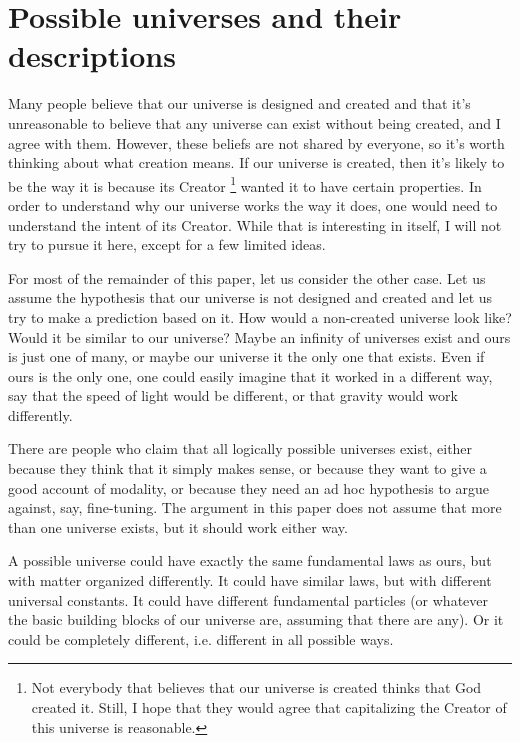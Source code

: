 \documentclass[a4paper
,draft
]{article}
\newcommand{\svn}[2][]{\todo[author=Virgil,color=red!25!white,#1]{#2}}
\newcommand{\paper}[1]{paper}
\newcommand{\ghilimele}[1]{``#1"}
\begin{document}
\section{Possible universes and their descriptions}

Many people believe that our universe is designed and created
and that it's unreasonable to believe that any universe can exist
without being created, and I agree with them.
However, these beliefs are not shared by everyone, so it's worth thinking
about what creation means.
If our universe is created, then it's likely to be the way it is because
its Creator
\footnote{Not everybody that believes that our universe is created
thinks that God created it.
Still, I hope that they would agree that capitalizing the Creator
of this universe is reasonable.}
\svn{Do I need this footnote?}{} wanted it to have certain properties.
In order to understand why our universe works the way it does,
one would need to understand the intent of its Creator.
While that is interesting in itself, I will not try to pursue it here,
except for a few limited ideas.

For most of the remainder of this \paper{}, let us consider the other case.
Let us assume the hypothesis that our universe is not designed and created
and let us try to make a prediction based on it.
How would a non-created universe look like?
Would it be similar to our universe?
Maybe an infinity of universes exist and ours is just one of many,
or maybe our universe it the only one that exists.
Even if ours is the only one, one could easily imagine that it worked
in a different way, say that the speed of light would be different,
or that gravity would work differently.

There are people who claim that all logically possible universes exist,
either because they think that it simply makes sense, or because they want to
give a good account of modality, or because they need
an ad hoc\svn{Do I need the \ghilimele{ad-hoc} part?}{} hypothesis
to argue against, say, fine-tuning.
The argument in this \paper{} does not assume that more than
one universe exists, but it should work either way.

A possible universe
could have exactly the same fundamental laws as ours, but with matter
organized differently.
It could have similar laws, but with different universal constants.
It could have different fundamental particles (or whatever the basic
building blocks of our universe are, assuming that there are any).
Or it could be completely different, i.e. different in all possible ways.
\end{document}
